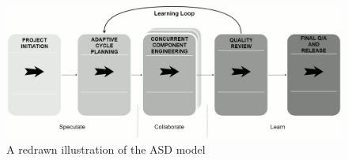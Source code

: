 \begin{figure}[H]
\hspace*{-1cm}
\centering
\includegraphics[scale=0.25]{figure/asd.png}
\caption{A redrawn illustration of the ASD model} %
\label{asd}
\end{figure}

